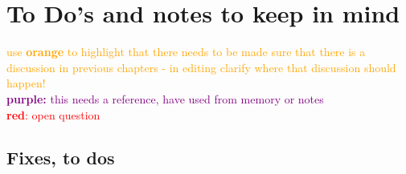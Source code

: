 \section{To Do's and notes to keep in mind}

\textcolor{orange}{use \textbf{orange} to highlight that there needs to be made sure that there is a discussion in previous chapters - in editing clarify where that discussion should happen!}\\
\textcolor{purple}{\textbf{purple:} this needs a reference,  have used from memory or notes}\\
\textcolor{red}{\textbf{red}: open question}




\subsection{Fixes, to dos}
